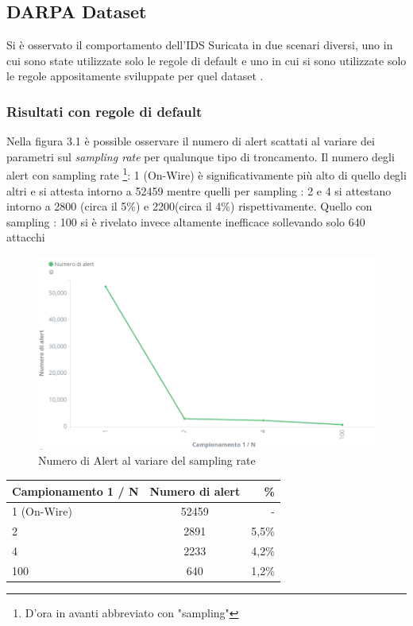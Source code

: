 \documentclass[12pt,a4paper,openright,twoside]{report}
\begin{document}
\clearpage
\subsection{DARPA Dataset}

Si \`e osservato il comportamento dell'IDS Suricata in due scenari diversi,
uno in cui sono state utilizzate solo le regole di default e uno in cui si
sono utilizzate solo le regole appositamente sviluppate per quel dataset \cite{EXP15}.

\subsubsection{Risultati con regole di default}

Nella figura 3.1 \`e possible osservare il numero di alert scattati al variare dei
parametri sul {\it sampling rate} per qualunque tipo di troncamento. Il numero degli
alert con sampling rate \footnote{D'ora in avanti abbreviato con "sampling"}: 1 (On-Wire)
\`e significativamente pi\`u alto di quello degli altri e
si attesta intorno a 52459 mentre quelli per sampling : 2 e 4 si attestano intorno a
2800 (circa il 5\%) e 2200(circa il 4\%) rispettivamente. Quello con sampling : 100 si \`e rivelato invece altamente
inefficace sollevando solo 640 attacchi

\begin{figure}[h!]
\begin{center}                          %
  \includegraphics[width=\textwidth]{images/DARPA-sampling-rate.png}
  \caption{Numero di Alert al variare del sampling rate}
  \label{}
\end{center}
\end{figure}
\begin{center}
  \begin{tabular}{| l | c | r |}
    \hline
    {\bf Campionamento 1 / N }& {\bf Numero di alert } & {\bf \% }\\ \hline
    1 (On-Wire) & 52459 & - \\ \hline
    2 & 2891 & 5,5\% \\ \hline
    4 & 2233 & 4,2\% \\ \hline
    100 & 640 & 1,2\% \\ \hline
  \end{tabular}
\end{center}
\end{document}
